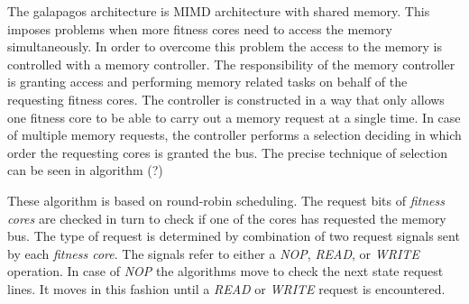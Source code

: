 The galapagos architecture is MIMD architecture with shared memory. This imposes problems when more fitness cores need to access the memory simultaneously. In order to overcome this problem the access to the memory is controlled with a memory controller. The responsibility of the memory controller is granting access and performing memory related tasks on behalf of the requesting fitness cores. The controller is constructed in a way that only allows one fitness core to be able to carry out a memory request at a single time. In case of multiple memory requests, the controller performs a selection deciding in which order the requesting cores is granted the bus. The precise technique of selection can be seen in algorithm (?)



These algorithm is based on round-robin scheduling. The request bits of \emph{fitness cores} are checked in turn to check if one of the cores has requested the memory bus. The type of request is determined by combination of two request signals sent by each \emph{fitness core}. The signals refer to either a \emph{NOP}, \emph{READ}, or \emph{WRITE} operation. In case of \emph{NOP} the algorithms move to check the next state request lines. It moves in this fashion until a \emph{READ} or \emph{WRITE} request is encountered. 



 








